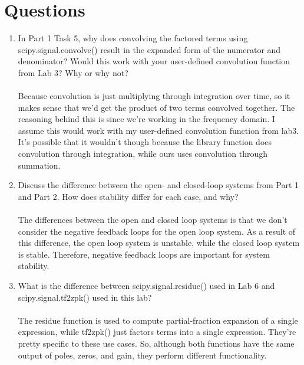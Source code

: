 \documentclass[12pt]{report}
\begin{document}
\section{Questions} %
    \begin{enumerate}
        \item  In Part 1 Task 5, why does convolving the factored terms using scipy.signal.convolve() result in the expanded form of the numerator and denominator? Would this work with your user-defined convolution function from Lab 3? Why or why not?
        \paragraph{} Because convolution is just multiplying through integration over time, so it makes sense that we'd get the product of two terms convolved together. The reasoning behind this is since we're working in the frequency domain. I assume this would work with my user-defined convolution function from lab3. It's possible that it wouldn't though because the library function does convolution through integration, while ours uses convolution through summation.
        \item Discuss the difference between the open- and closed-loop systems from Part 1 and Part 2. How does stability differ for each case, and why?
        \paragraph{}   The differences between the open and closed loop systems is that we don't consider the negative feedback loops for the open loop system. As a result of this difference, the open loop system is unstable, while the closed loop system is stable. Therefore, negative feedback loops are important for system stability. 
        
        \item What is the difference between scipy.signal.residue() used in Lab 6 and scipy.signal.tf2zpk() used in this lab?
        \paragraph{} The residue function is used to compute partial-fraction expansion of a single expression, while tf2zpk() just factors terms into a single expression. They're pretty specific to these use cases. So, although both functions have the same output of poles, zeros, and gain, they perform different functionality.  
                

\end{enumerate}
\end{document}
